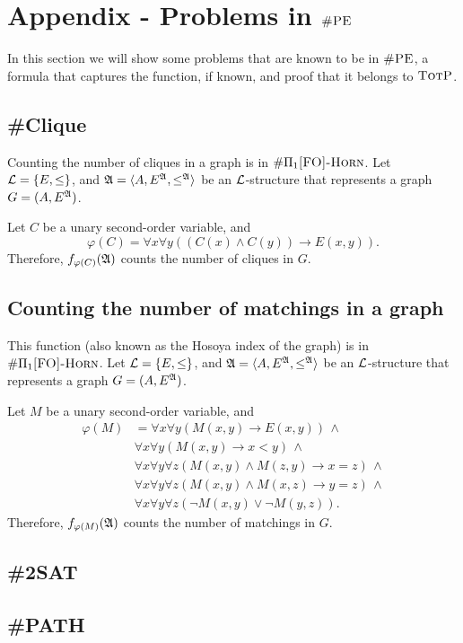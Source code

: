 \section{Appendix - Problems in $\textsc{\#PE}$}

In this section we will show some problems that are known to be in $\textsc{\#PE}$, a formula that captures the function, if known, and proof that it belongs to $\textsc{TotP}$.

\subsection{\#Clique}
Counting the number of cliques in a graph is in $\#\Pi_{1}\textsc{[FO]-Horn}$. Let ${\cal L} = \{E,\leq\}$, and ${\frak A} = \langle A, E^{{\frak A}}, \leq^{{\frak A}} \rangle$ be an ${\cal L}$-structure that represents a graph $G = (A,E^{{\frak A}})$.

Let $C$ be a unary second-order variable, and
\[
\varphi(C) = \forall x \forall y((C(x)\wedge C(y))\to E(x,y)).
\]
Therefore, $f_{\varphi(C)}({\frak A})$ counts the number of cliques in $G$.

\subsection{Counting the number of matchings in a graph}
This function (also known as the Hosoya index of the graph) is in $\#\Pi_{1}\textsc{[FO]-Horn}$. Let ${\cal L} = \{E,\leq\}$, and ${\frak A} = \langle A, E^{{\frak A}}, \leq^{{\frak A}} \rangle$ be an ${\cal L}$-structure that represents a graph $G = (A,E^{{\frak A}})$.

Let $M$ be a unary second-order variable, and
\begin{align*}
\varphi(M) &= \forall x \forall y (M(x,y)\to E(x,y))\,\wedge \\
& \forall x \forall y (M(x,y)\to x < y)\,\wedge \\
& \forall x \forall y \forall z(M(x,y)\wedge M(z,y) \to x = z)\,\wedge \\
& \forall x \forall y \forall z(M(x,y)\wedge M(x,z) \to y = z)\,\wedge \\
& \forall x \forall y \forall z(\neg M(x,y)\vee \neg M(y,z)).
\end{align*}
Therefore, $f_{\varphi(M)}({\frak A})$ counts the number of matchings in $G$.
\subsection{\#2SAT}

\subsection{\#PATH}

